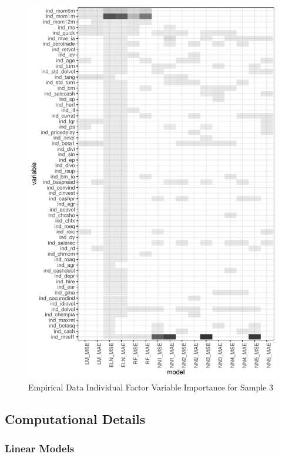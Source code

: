 \documentclass[11pt, a4paper, table]{article}
\begin{document}
\begin{figure}
	\includegraphics{empirical_sample_3_vi_ind.pdf}
	\caption{Empirical Data Individual Factor Variable Importance for Sample 3}
\end{figure}

\label{computation}

\newpage

\subsection{Computational Details}

\subsubsection{Linear Models}
\end{document}
